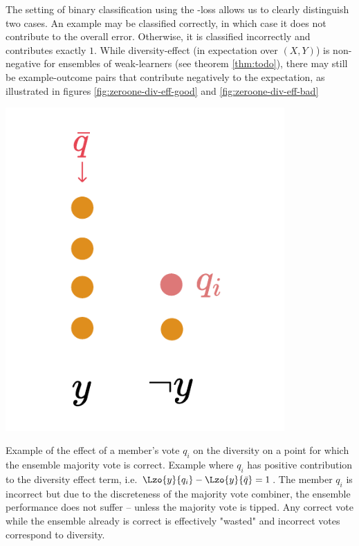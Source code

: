\documentclass[../main.tex]{subfiles}
\begin{document}
The setting of binary classification using the \zeroone-loss allows us to clearly distinguish two cases. An example may be classified correctly, in which case it does not contribute to the overall error. Otherwise, it is classified incorrectly and contributes exactly $1$.
While diversity-effect (in expectation over $(X,Y)$) is non-negative for ensembles of weak-learners (see theorem \ref{thm:todo}), there may still be example-outcome pairs that contribute negatively to the expectation, as illustrated in figures \ref{fig:zeroone-div-eff-good} and \ref{fig:zeroone-div-eff-bad}

\begin{marginfigure}
    \label{fig:zeroone-div-eff-good}
    \includegraphics[width=0.8\textwidth]{figma-illustrations/zeroone-div-effect-good.pdf}
    \caption{
        Example of the effect of a member's vote $q_i$ on the diversity on a point for which the ensemble majority vote is correct.
    Example where $q_i$ has positive contribution to the diversity effect term, i.e. 
$\Lzo{y}{q_{i}} - \Lzo{y}{\bar{q}} = 1$. The member $q_{i}$ is incorrect but due to the discreteness of the majority vote combiner, the ensemble performance does not suffer -- unless the majority vote is tipped. Any correct vote while the ensemble already is correct is effectively "wasted" and incorrect votes correspond to diversity.
}
\end{marginfigure}
\end{document}
